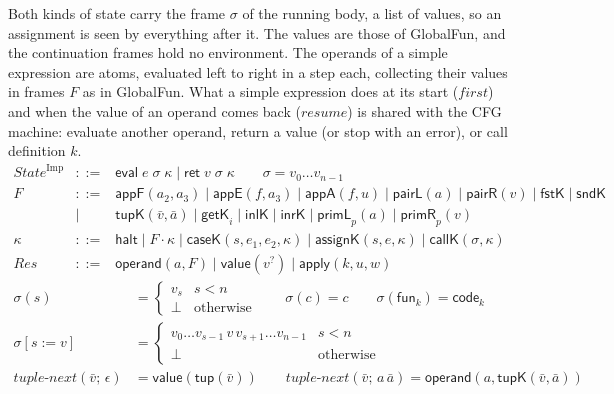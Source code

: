 \documentclass[10pt]{article}
\theoremstyle{acmplain}
\newcommand{\key}[1]{\mathsf{#1}}
\newcommand{\funref}[1]{\key{fun}_{#1}}
\newcommand{\tupV}[1]{\key{tup}(#1)}
\newcommand{\codeV}[1]{\key{code}_{#1}}
\newcommand{\Kf}[2]{\key{#1}(#2)}
\newcommand{\halt}{\key{halt}}
\newcommand{\evi}[3]{\key{eval}\;#1\;#2\;#3}
\newcommand{\rti}[3]{\key{ret}\;#1\;#2\;#3}
\newcommand{\tnext}{\mathit{tuple\text{-}next}}
\begin{document}
Both kinds of state carry the frame $\sigma$ of the running body, a list
of values, so an assignment is seen by everything after it. The values
are those of GlobalFun, and the continuation frames hold no environment.
The operands of a simple expression are atoms, evaluated left to right
in a step each, collecting their values in frames $F$ as in GlobalFun. What
a simple expression does at its start ($\mathit{first}$) and when the
value of an operand comes back ($\mathit{resume}$) is shared with the CFG
machine: evaluate another operand, return a value (or stop with an error), or call
definition $k$.
\[
\begin{array}{rcl}
  \mathit{State}^{\mathrm{Imp}} &::=& \evi{e}{\sigma}{\kappa} \mid \rti{v}{\sigma}{\kappa} \qquad
  \sigma = v_0 \ldots v_{n-1} \\
  F &::=& \key{appF}(a_2, a_3) \mid \key{appE}(f, a_3) \mid \key{appA}(f, u)
    \mid \key{pairL}(a) \mid \key{pairR}(v) \mid \key{fstK} \mid \key{sndK} \\
  &\mid& \key{tupK}(\bar{v}, \bar{a}) \mid \key{getK}_i \mid \key{inlK} \mid \key{inrK}
    \mid \key{primL}_p(a) \mid \key{primR}_p(v) \\
  \kappa &::=& \halt \mid F \cdot \kappa \mid \Kf{caseK}{s, e_1, e_2, \kappa}
    \mid \Kf{assignK}{s, e, \kappa} \mid \Kf{callK}{\sigma, \kappa} \\
  \mathit{Res} &::=& \key{operand}(a, F) \mid \key{value}(v^?) \mid \key{apply}(k, u, w)
\end{array}
\]
\begin{align*}
  \sigma(s) &= \begin{cases} v_s & s < n \\ \bot & \text{otherwise} \end{cases}
  \qquad \sigma(c) = c \qquad \sigma(\funref{k}) = \codeV{k} \\
  \sigma[s := v] &= \begin{cases} v_0 \ldots v_{s-1}\, v\, v_{s+1} \ldots v_{n-1} & s < n \\ \bot & \text{otherwise} \end{cases} \\[1ex]
  \tnext(\bar{v};\, \epsilon) &= \key{value}(\tupV{\bar{v}}) \qquad
  \tnext(\bar{v};\, a\,\bar{a}) = \key{operand}(a, \key{tupK}(\bar{v}, \bar{a}))
\end{align*}
\end{document}
